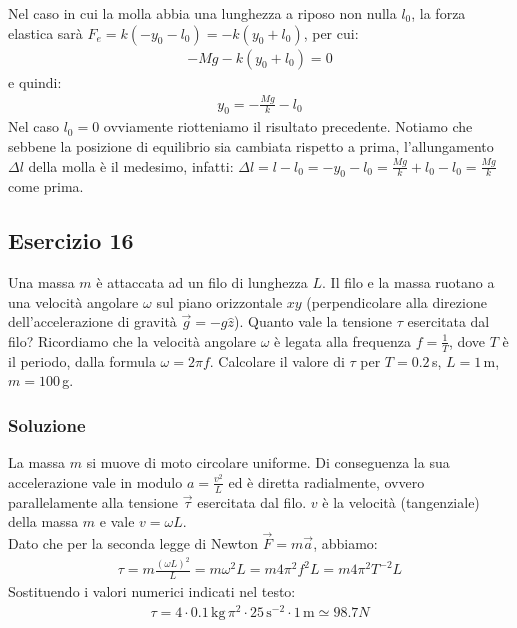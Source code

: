 \documentclass[12pt,a4paper]{book}
\begin{document}
Nel caso in cui la molla abbia una lunghezza a riposo non nulla $l_0$, la forza elastica sarà $F_e=k(-y_0-l_0)=-k(y_0+l_0)$, per cui:
\begin{gather*}
-Mg-k(y_0+l_0)=0
\end{gather*}
e quindi:
\begin{gather*}
y_0=-\frac{Mg}{k}-l_0
\end{gather*}
Nel caso $l_0=0$ ovviamente riotteniamo il risultato precedente. Notiamo che sebbene la posizione di equilibrio sia cambiata rispetto a prima, 
l'allungamento $\Delta l$ della molla è il medesimo, infatti: $\Delta l=l-l_0=-y_0-l_0=\frac{Mg}{k}+l_0-l_0=\frac{Mg}{k}$ come prima.


\subsection*{Esercizio 16}
Una massa $m$ è attaccata ad un filo di lunghezza $L$. Il filo e la massa ruotano a una velocità angolare $\omega$ sul piano orizzontale $xy$ (perpendicolare
alla direzione dell'accelerazione di gravità $\vec{g}=-g\hat{z}$). Quanto vale la tensione $\tau$ esercitata dal filo? Ricordiamo
che la velocità angolare $\omega$ è legata alla frequenza $f=\frac{1}{T}$, dove $T$ è il periodo, dalla formula $\omega=2\pi f$. 
Calcolare il valore di $\tau$ per $T=0.2 \,$s,  $L=1\,$m, $m=100 \,$g. 

\subsubsection*{Soluzione}
La massa $m$ si muove di moto circolare uniforme. Di conseguenza la sua accelerazione vale in modulo $a=\frac{v^2}{L}$ ed è diretta radialmente, ovvero parallelamente alla tensione $\vec{\tau}$ esercitata dal filo. $v$ è la velocità (tangenziale) della massa $m$ e vale $v=\omega L$.\\

Dato che per la seconda legge di Newton $\vec{F}=m\vec{a}$, abbiamo:
\begin{gather*}
\tau=m \frac{(\omega L)^2}{L}=m \omega^2 L= m 4 \pi^2 f^2 L = m 4 \pi^2 T^{-2} L
\end{gather*}
Sostituendo i valori numerici indicati nel testo:
\begin{gather*}
\tau= 4 \cdot 0.1 \, \text{kg} \, \pi^2 \cdot 25 \, \text{s}^{-2} \cdot 1 \, \text{m} \simeq 98.7 N
\end{gather*}


\clearpage
\end{document}
